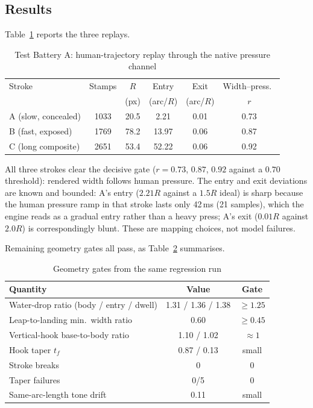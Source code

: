 \documentclass[conference]{IEEEtran}
\begin{document}
\subsection{Results}

Table~\ref{tab:batteryA} reports the three replays.

\begin{table}[t]
\caption{Test Battery A: human-trajectory replay through the native pressure channel}
\label{tab:batteryA}
\centering
\small
\begin{tabular}{lccccc}
\toprule
Stroke & Stamps & $R$ & Entry & Exit & Width--press.\ \\
 & & (px) & (arc/$R$) & (arc/$R$) & $r$ \\
\midrule
A (slow, concealed) & 1033 & 20.5 & 2.21 & 0.01 & 0.73 \\
B (fast, exposed)   & 1769 & 78.2 & 13.97 & 0.06 & 0.87 \\
C (long composite)  & 2651 & 53.4 & 52.22 & 0.06 & 0.92 \\
\bottomrule
\end{tabular}
\end{table}

All three strokes clear the decisive gate ($r=0.73$, $0.87$, $0.92$ against a
$0.70$ threshold): rendered width follows human pressure. The entry and exit
deviations are known and bounded: A's entry ($2.21R$ against a $1.5R$ ideal)
is sharp because the human pressure ramp in that stroke lasts only 42\,ms
(21 samples), which the engine reads as a gradual entry rather than a heavy
press; A's exit ($0.01R$ against $2.0R$) is correspondingly blunt. These are
mapping choices, not model failures.

Remaining geometry gates all pass, as Table~\ref{tab:gates} summarises.

\begin{table}[t]
\caption{Geometry gates from the same regression run}
\label{tab:gates}
\centering
\small
\begin{tabular}{lcc}
\toprule
Quantity & Value & Gate \\
\midrule
Water-drop ratio (body / entry / dwell) & 1.31 / 1.36 / 1.38 & $\ge 1.25$ \\
Leap-to-landing min.\ width ratio & 0.60 & $\ge 0.45$ \\
Vertical-hook base-to-body ratio & 1.10 / 1.02 & $\approx 1$ \\
Hook taper $t_f$ & 0.87 / 0.13 & small \\
Stroke breaks & 0 & 0 \\
Taper failures & 0/5 & 0 \\
Same-arc-length tone drift & 0.11 & small \\
\bottomrule
\end{tabular}
\end{table}
\end{document}
